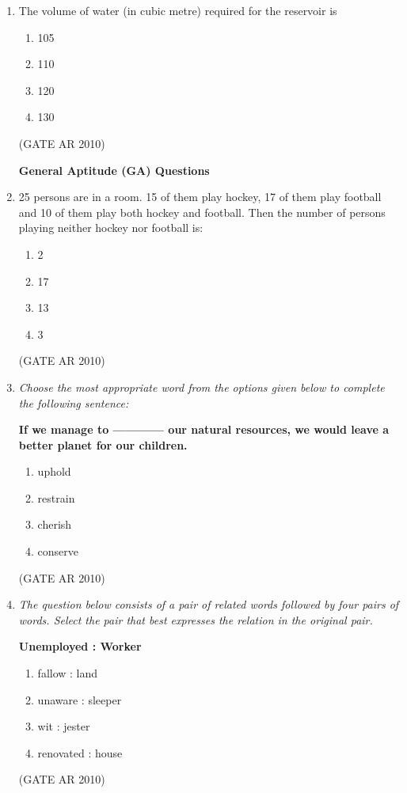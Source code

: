 \documentclass[journal]{IEEEtran}
\begin{document}
\begin{enumerate}
\item The volume of water (in cubic metre) required for the reservoir is
\begin{multicols}{2}
\begin{enumerate}
\item 105
\item 110
\item 120
\item 130
\end{enumerate}
\end{multicols}
\hfill (GATE AR 2010)

\textbf{General Aptitude (GA) Questions}

\item 25 persons are in a room. 15 of them play hockey, 17 of them play football and 10 of them play both hockey and football. Then the number of persons playing neither hockey nor football is:
\begin{multicols}{4}
\begin{enumerate}
\item 2
\item 17
\item 13
\item 3
\end{enumerate}
\end{multicols}
\hfill (GATE AR 2010)

\item \textit{Choose the most appropriate word from the options given below to complete the following sentence:}

\textbf{If we manage to ------------ our natural resources, we would leave a better planet for our children.}

\begin{enumerate}
\item uphold
\item restrain
\item cherish
\item conserve
\end{enumerate}
\hfill (GATE AR 2010)

\item \textit{The question below consists of a pair of related words followed by four pairs of words. Select the pair that best expresses the relation in the original pair.}

\textbf{Unemployed : Worker}

\begin{enumerate}
\item fallow : land
\item unaware : sleeper
\item wit : jester
\item renovated : house
\end{enumerate}
\hfill (GATE AR 2010)


\end{enumerate}
\end{document}
